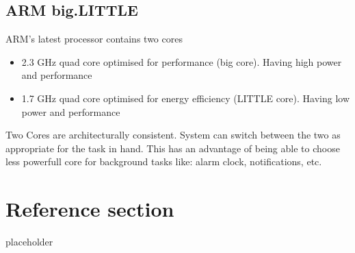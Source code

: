 \documentclass{article}
\begin{document}
\subsection{ARM big.LITTLE}
ARM's latest processor contains two cores
\begin{itemize}
  \item 2.3 GHz quad core optimised for performance (big core). Having high power and performance
  \item 1.7 GHz quad core optimised for energy efficiency (LITTLE core). Having low power and performance 
\end{itemize}
Two Cores are architecturally consistent. System can switch between the two as appropriate for the task in hand. This has an advantage of being able to choose less powerfull core for background tasks like: alarm clock, notifications, etc.

\pagebreak
\section*{Reference section} \label{sec:reference}
\begin{description}
	\item[placeholder] \hfill \\
\end{description}
\end{document}

